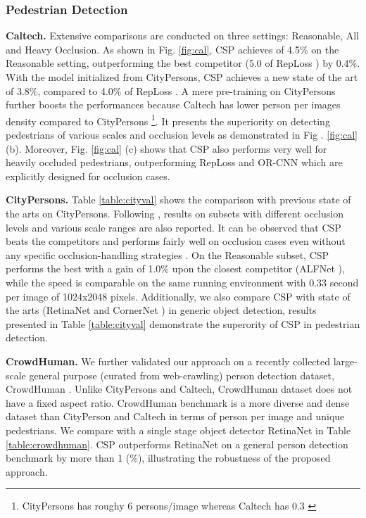 \documentclass[review]{elsarticle}
\begin{document}
\subsubsection{Pedestrian Detection}
\textbf{Caltech.}
Extensive comparisons are conducted on three settings: Reasonable, All and Heavy Occlusion.
As shown in Fig. \ref{fig:cal}, CSP achieves  of 4.5\% on the Reasonable setting, outperforming the best competitor (5.0 of RepLoss \cite{wang2017repulsion}) by 0.4\%. With the model initialized from CityPersons\cite{zhang2017citypersons}, CSP achieves a new state of the art of 3.8\%, compared to 4.0\% of RepLoss \cite{wang2017repulsion}. A mere  pre-training on CityPersons further boosts the performances because Caltech has lower person per images density compared to CityPersons \footnote{ CityPersons has roughy 6 persons/image whereas Caltech has 0.3 \cite{shao2018crowdhuman}}. It presents the superiority on detecting pedestrians of various scales and occlusion levels as demonstrated in Fig . \ref{fig:cal} (b). Moreover, Fig. \ref{fig:cal} (c) shows that CSP also performs very well for heavily occluded pedestrians, outperforming RepLoss \cite{wang2017repulsion} and OR-CNN \cite{Zhang_2018_ECCV} which are explicitly designed for occlusion cases.

\textbf{CityPersons.}
Table \ref{table:cityval} shows the comparison with previous state of the arts on CityPersons.
Following \cite{wang2017repulsion, zhang2017citypersons}, results on subsets with different occlusion levels and various scale ranges are also reported. It can be observed that CSP beats the competitors and performs fairly well on occlusion cases even without any specific occlusion-handling strategies \cite{wang2017repulsion,Zhang_2018_ECCV}.
On the Reasonable subset, CSP performs the best with a gain of 1.0\%  upon the closest competitor (ALFNet \cite{Liu_2018_ECCV}), while the speed is comparable on the same running environment with 0.33 second per image of 1024x2048 pixels. Additionally, we also compare CSP with state of the arts (RetinaNet \cite{lin2017focal} and CornerNet \cite{Law_2018_ECCV}) in generic object detection, results presented in Table \ref{table:cityval} demonstrate the superority of CSP in pedestrian detection.

\textbf{CrowdHuman.} We further validated our approach on a recently collected large-scale general purpose (curated from web-crawling) person detection dataset, CrowdHuman \cite{shao2018crowdhuman}. Unlike CityPersons and Caltech, CrowdHuman dataset does not have a fixed aspect ratio. CrowdHuman benchmark is a more diverse and dense dataset than CityPerson and Caltech in terms of person per image and unique pedestrians. We compare with a single stage object detector RetinaNet \cite{lin2017focal} in Table \ref{table:crowdhuman}. CSP outperforms RetinaNet \cite{lin2017focal} on a general person detection benchmark by more than 1 (\%), illustrating the robustness of the proposed approach.
\end{document}
